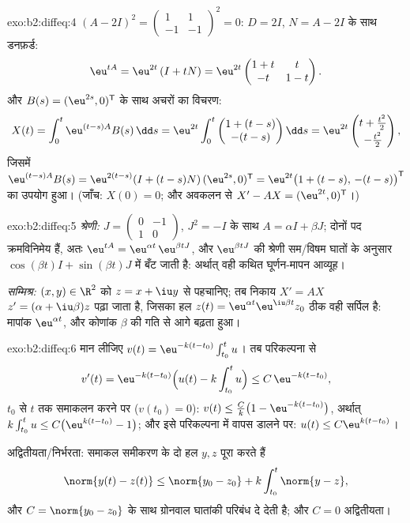 \begin{solution}{exo:b2:diffeq:4}
$(A - 2I)^2 = \begin{pmatrix}1 & 1\\ -1 & -1\end{pmatrix}^2 = 0$: $D = 2I$, $N = A - 2I$ के साथ डनफ़र्ड:
\[
\eu^{tA} = \eu^{2t}\,(I + tN)
= \eu^{2t}\begin{pmatrix} 1 + t & t\\ -t & 1 - t\end{pmatrix}.
\]
और $B(s) = (\eu^{2s}, 0)^{\mathsf T}$ के साथ अचरों का विचरण:
\[
X(t) = \int_0^t \eu^{(t-s)A}B(s)\,\dd s
= \eu^{2t}\int_0^t \begin{pmatrix} 1 + (t-s)\\ -(t-s)
\end{pmatrix}\dd s
= \eu^{2t}\begin{pmatrix} t + \frac{t^2}{2}\\[2pt] -\frac{t^2}{2}
\end{pmatrix},
\]
जिसमें $\eu^{(t-s)A}B(s) = \eu^{2(t-s)}(I + (t-s)N)\,(\eu^{2s},
0)^{\mathsf T} = \eu^{2t}\bigl(1 + (t-s),\, -(t-s)\bigr)^{\mathsf
T}$ का उपयोग हुआ। (जाँच: $X(0) = 0$; और अवकलन से $X' - AX = (\eu^{2t}, 0)^{\mathsf T}$।)
\end{solution}

\begin{solution}{exo:b2:diffeq:5}
\emph{श्रेणी:} $J =
\begin{pmatrix}0 & -1\\ 1 & 0\end{pmatrix}$, $J^2 = -I$ के साथ $A = \alpha I + \beta J$; दोनों पद क्रमविनिमेय हैं, अतः $\eu^{tA} = \eu^{\alpha t}\,\eu^{\beta tJ}$,
और $\eu^{\beta t J}$ की श्रेणी सम/विषम घातों के अनुसार $\cos(\beta t)I + \sin(\beta t)J$ में बँट जाती है: अर्थात् वही
कथित घूर्णन-मापन आव्यूह।

\emph{सम्मिश्र:} $(x, y) \in \R^2$ को $z = x + \iu y$ से पहचानिए; तब निकाय $X' = AX$ $z' = (\alpha + \iu\beta)z$ पढ़ा जाता है,
जिसका हल $z(t) = \eu^{\alpha t}\eu^{\iu\beta t}z_0$ ठीक वही सर्पिल है: मापांक $\eu^{\alpha t}$, और कोणांक $\beta$ की गति से आगे
बढ़ता हुआ।
\end{solution}

\begin{solution}{exo:b2:diffeq:6}
मान लीजिए $v(t) = \eu^{-k(t - t_0)}\int_{t_0}^t u$। तब परिकल्पना से
\[
v'(t) = \eu^{-k(t-t_0)}\Bigl(u(t) - k\int_{t_0}^t u\Bigr)
\leq C\,\eu^{-k(t-t_0)},
\]
$t_0$ से $t$ तक समाकलन करने पर ($v(t_0) = 0$): $v(t) \leq \frac{C}{k}\bigl(1 - \eu^{-k(t - t_0)}\bigr)$, अर्थात् $k\int_{t_0}^t u \leq C\bigl(\eu^{k(t-t_0)} - 1\bigr)$; और इसे परिकल्पना
में वापस डालने पर: $u(t) \leq C\eu^{k(t-t_0)}$।

अद्वितीयता/निर्भरता: समाकल समीकरण के दो हल $y, z$ पूरा करते हैं
\[
\norm{y(t) - z(t)} \leq \norm{y_0 - z_0} +
k\int_{t_0}^{t}\norm{y - z},
\]
और $C = \norm{y_0 - z_0}$ के साथ ग्रोनवाल घातांकी परिबंध दे देती है; और $C = 0$ अद्वितीयता।
\end{solution}

